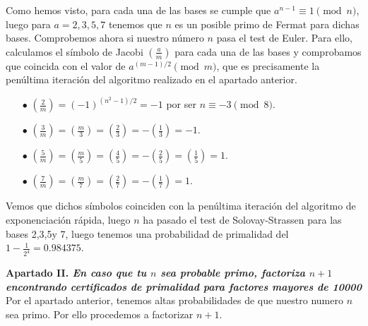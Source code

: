 \documentclass[fleqn]{article}
\begin{document}
    Como hemos visto, para cada una de las bases se cumple que $a^{n-1} \equiv 1 \pmod{n}$, luego para
    $a = 2,3,5,7$ tenemos que $n$ es un posible primo de Fermat para dichas bases. Comprobemos ahora si nuestro número $n$ 
    pasa el test de Euler. Para ello, calculamos el símbolo de Jacobi $\left(\frac{a}{m}\right)$ para cada una de las bases 
    y comprobamos que coincida con el valor de $a^{(m-1)/2} \pmod{m}$, que es precisamente la penúltima iteración del 
    algoritmo realizado en el apartado anterior.\\
    \begin{enumerate}
        \item[$\bullet$] $\left(\frac{2}{m}\right) = (-1)^{(n^2 - 1) / 2} = -1$ por ser $n \equiv -3 \pmod{8}$.
        \item[$\bullet$] $\left(\frac{3}{m}\right) = \left(\frac{m}{3}\right) = \left(\frac{2}{3}\right) = -\left(\frac{1}{3}\right) = -1$.
        \item[$\bullet$] $\left(\frac{5}{m}\right) = \left(\frac{m}{5}\right) = \left(\frac{4}{5}\right) = - \left(\frac{2}{5}\right) = \left(\frac{1}{5}\right) = 1$.
        \item[$\bullet$] $\left(\frac{7}{m}\right) = \left(\frac{m}{7}\right) = \left(\frac{2}{7}\right) = - \left(\frac{1}{7}\right) = 1$.
    \end{enumerate}

    Vemos que dichos símbolos coinciden con la penúltima iteración del algoritmo de exponenciación rápida, luego $n$ ha pasado el test de Solovay-Strassen
    para las bases 2,3,5y 7, luego tenemos una probabilidad de primalidad del $1-\frac{1}{2^4} = 0.984375$.



    \newpage
    \textbf{Apartado II. \textit{En caso que tu $n$ sea probable primo, factoriza $n+1$ encontrando certificados de primalidad 
            para factores mayores de 10000}}\\
    Por el apartado anterior, tenemos altas probabilidades de que nuestro numero $n$ sea primo. Por ello procedemos a factorizar $n+1$.
\end{document}
